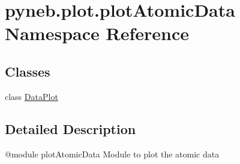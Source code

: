 \hypertarget{namespacepyneb_1_1plot_1_1plot_atomic_data}{\section{pyneb.\-plot.\-plot\-Atomic\-Data Namespace Reference}
\label{namespacepyneb_1_1plot_1_1plot_atomic_data}
}
\subsection*{Classes}
\begin{DoxyCompactItemize}
\item 
class \hyperlink{classpyneb_1_1plot_1_1plot_atomic_data_1_1_data_plot}{Data\-Plot}
\end{DoxyCompactItemize}


\subsection{Detailed Description}
\begin{DoxyVerb}@module plotAtomicData
Module to plot the atomic data
\end{DoxyVerb}
 